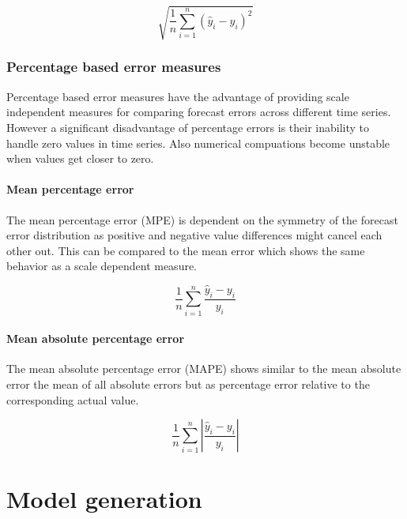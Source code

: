 \begin{equation}
	\sqrt{\frac{1}{n} \sum_{i=1}^{n} (\hat{y}_i - y_i)^2}
\label{eq:acc_rmse}
\end{equation}


\subsubsection{Percentage based error measures}

Percentage based error measures have the advantage of providing scale independent measures for comparing forecast errors across different time series. However a significant disadvantage of percentage errors is their inability to handle zero values in time series. Also numerical compuations become unstable when values get closer to zero. 


\paragraph{Mean percentage error}

The mean percentage error (MPE) is dependent on the symmetry of the forecast error distribution as positive and negative value differences might cancel each other out. This can be compared to the mean error which shows the same behavior as a scale dependent measure. 


\begin{equation}
\frac{1}{n} \sum_{i=1}^{n} \frac{\hat{y}_i - y_i}{y_i}
\label{eq:acc_mpe}
\end{equation}



\paragraph{Mean absolute percentage error}

The mean absolute percentage error (MAPE) shows similar to the mean absolute error the mean of all absolute errors but as percentage error relative to the corresponding actual value. 

\begin{equation}
\frac{1}{n} \sum_{i=1}^{n} \left|\frac{\hat{y}_i - y_i}{y_i}\right|
\label{eq:acc_mape}
\end{equation}




\section{Model generation} \label{sec:model_generation}

